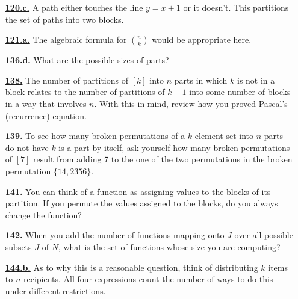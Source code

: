 \documentclass[10pt,]{book}
\theoremstyle{plain}
\theoremstyle{definition}
\theoremstyle{definition}
\theoremstyle{definition}
\numberwithin{equation}{chapter}
\begin{document}
\begin{itemize}[itemsep=1em]
\hypertarget{a-120.c}{}\item[\textbf{\hyperref[task-125]{120.c.}}]
\hypertarget{p-609}{}%
A path either touches the line \(y = x + 1\) or it doesn't. This partitions the set of paths into two blocks.%

\hypertarget{a-121.a}{}\item[\textbf{\hyperref[task-126]{121.a.}}]
\hypertarget{p-613}{}%
The algebraic formula for \(\binom{n}{k}\) would be appropriate here.%

\hypertarget{a-136.d}{}\item[\textbf{\hyperref[task-141]{136.d.}}]
\hypertarget{p-665}{}%
What are the possible sizes of parts?%

\hypertarget{a-138}{}\item[\textbf{\hyperref[secondstirlingrecurrence]{138.}}]
\hypertarget{p-672}{}%
The number of partitions of \([k]\) into \(n\) parts in which \(k\) is not in a block relates to the number of partitions of \(k-1\) into some number of blocks in a way that involves \(n\). With this in mind, review how you proved Pascal's (recurrence) equation.%

\hypertarget{a-139}{}\item[\textbf{\hyperref[activity-139]{139.}}]
\hypertarget{p-675}{}%
To see how many broken permutations of a \(k\) element set into \(n\) parts do not have \(k\) is a part by itself, ask yourself how many broken permutations of \([7]\) result from adding 7 to the one of the two permutations in the broken permutation \(\{14, 2356\}\).%

\hypertarget{a-141}{}\item[\textbf{\hyperref[activity-141]{141.}}]
\hypertarget{p-682}{}%
You can think of a function as assigning values to the blocks of its partition. If you permute the values assigned to the blocks, do you always change the function?%

\hypertarget{a-142}{}\item[\textbf{\hyperref[Stirlingfalling]{142.}}]
\hypertarget{p-686}{}%
When you add the number of functions mapping onto \(J\) over all possible subsets \(J\) of \(N\), what is the set of functions whose size you are computing?%

\hypertarget{a-144.b}{}\item[\textbf{\hyperref[task-145]{144.b.}}]
\hypertarget{p-695}{}%
As to why this is a reasonable question, think of distributing \(k\) items to \(n\) recipients.  All four expressions count the number of ways to do this under different restrictions.%


\end{itemize}
\end{document}
